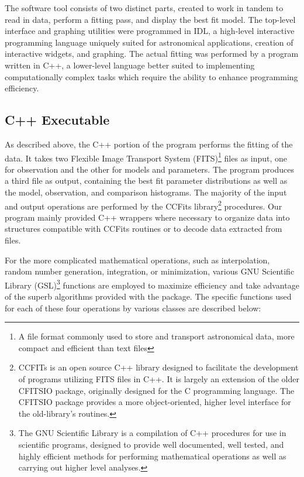 \documentclass[twocolumn,letterpaper,10pt]{article}
\begin{document}
The software tool consists of two distinct parts, created to work in tandem to read in data, perform a fitting pass, and display the best fit model. The top-level interface and graphing utilities were programmed in IDL, a high-level interactive programming language uniquely suited for astronomical applications, creation of interactive widgets, and graphing. The actual fitting was performed by a program written in C++, a lower-level language better suited to implementing computationally complex tasks which require the ability to enhance programming efficiency.

\subsection{C++ Executable}

As described above, the C++ portion of the program performs the fitting of the data. It takes two Flexible Image Transport System (FITS)\footnote{A file format commonly used to store and transport astronomical data, more compact and efficient than text files} files as input, one for observation and the other for models and parameters. The program produces a third file as output, containing the best fit parameter distributions as well as the model, observation, and comparison histograms. The majority of the input and output operations are performed by the CCFits library\footnote{CCFITs \citep{CCFITS} is an open source C++ library designed to facilitate the development of programs utilizing FITS files in C++. It is largely an extension of the older CFITSIO \citep{CFITSIO} package, originally designed for the C programming language. The CFITSIO package provides a more object-oriented, higher level interface for the old-library's routines.} procedures. Our program mainly provided C++ wrappers where necessary to organize data into structures compatible with CCFits routines or to decode data extracted from files. 

For the more complicated mathematical operations, such as interpolation, random number generation, integration, or minimization, various GNU Scientific Library (GSL)\footnote{The GNU Scientific Library \citep[GSL, ][]{GSL} is a compilation of C++ procedures for use in scientific programs, designed to provide well documented, well tested, and highly efficient methods for performing mathematical operations as well as carrying out higher level analyses.} functions are employed to maximize efficiency and take advantage of the superb algorithms provided with the package. The specific functions used for each of these four operations by various classes are described below:
\end{document}

